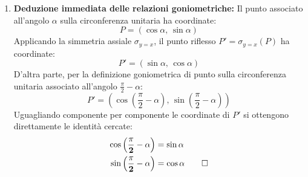 \documentclass[11pt,a4paper,oneside]{report}
\begin{document}
\begin{teorema}
\begin{enumerate}
    \item \textbf{Deduzione immediata delle relazioni goniometriche:}
    Il punto associato all'angolo $\alpha$ sulla circonferenza unitaria ha coordinate:
    \begin{equation}
        P = (\cos\alpha, \, \sin\alpha)
    \end{equation}
    Applicando la simmetria assiale $\sigma_{y=x}$, il punto riflesso $P' = \sigma_{y=x}(P)$ ha coordinate:
    \begin{equation}
        P' = (\sin\alpha, \, \cos\alpha)
    \end{equation}
    D'altra parte, per la definizione goniometrica di punto sulla circonferenza unitaria associato all'angolo $\frac{\pi}{2} - \alpha$:
    \begin{equation}
        P' = \left(\cos\left(\frac{\pi}{2} - \alpha\right), \, \sin\left(\frac{\pi}{2} - \alpha\right)\right)
    \end{equation}
    Uguagliando componente per componente le coordinate di $P'$ si ottengono direttamente le identità cercate:
    \begin{align}
        \mathbf{\cos\left(\frac{\pi}{2} - \alpha\right)} &= \mathbf{\sin\alpha} \\
        \mathbf{\sin\left(\frac{\pi}{2} - \alpha\right)} &= \mathbf{\cos\alpha} \qedhere
    \end{align}
\end{enumerate}
\end{teorema}
\end{document}
